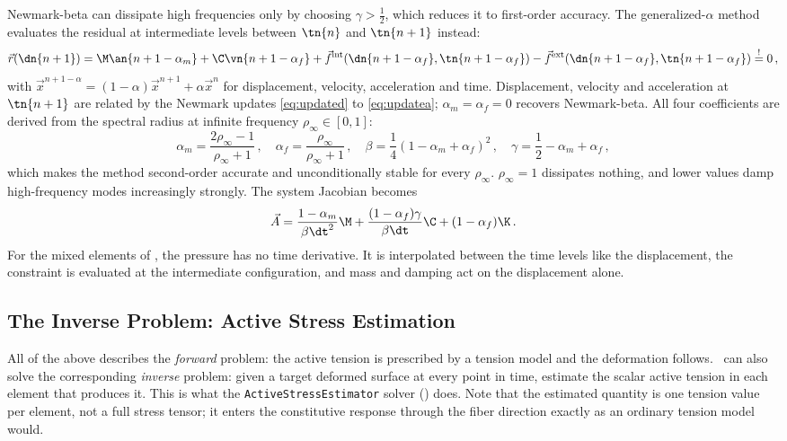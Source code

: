 Newmark-beta can dissipate high frequencies only by choosing $\gamma > \frac{1}{2}$, which reduces it to first-order accuracy.
The generalized-$\alpha$ method \cite{chung1993} evaluates the residual at intermediate levels between $\tn{n}$ and $\tn{n+1}$ instead:
\begin{equation}
    \vec r(\dn{n+1}) = \M \an{n+1-\alpha_m} + \C \vn{n+1-\alpha_f} + \vec f^\mathrm{int}(\dn{n+1-\alpha_f}, \tn{n+1-\alpha_f}) - \vec f^\mathrm{ext}(\dn{n+1-\alpha_f}, \tn{n+1-\alpha_f}) \overset{!}{=} 0 \,,
\end{equation}
with $\vec x^{n+1-\alpha} = (1-\alpha) \vec x^{n+1} + \alpha \vec x^{n}$ for displacement, velocity, acceleration and time.
Displacement, velocity and acceleration at $\tn{n+1}$ are related by the Newmark updates \autoref{eq:updated} to \autoref{eq:updatea}; $\alpha_m = \alpha_f = 0$ recovers Newmark-beta.
All four coefficients are derived from the spectral radius at infinite frequency $\rho_\infty \in [0, 1]$:
\begin{equation}
    \alpha_m = \frac{2\rho_\infty - 1}{\rho_\infty + 1} \,, \quad
    \alpha_f = \frac{\rho_\infty}{\rho_\infty + 1} \,, \quad
    \beta = \frac{1}{4} (1 - \alpha_m + \alpha_f)^2 \,, \quad
    \gamma = \frac{1}{2} - \alpha_m + \alpha_f \,,
\end{equation}
which makes the method second-order accurate and unconditionally stable for every $\rho_\infty$.
$\rho_\infty = 1$ dissipates nothing, and lower values damp high-frequency modes increasingly strongly.
The system Jacobian becomes
\begin{equation}
    \vec A = \frac{1-\alpha_m}{\beta \dt^2} \M + \frac{(1-\alpha_f) \gamma}{\beta \dt} \C + (1-\alpha_f) \K \,.
\end{equation}
For the mixed elements of , the pressure has no time derivative.
It is interpolated between the time levels like the displacement, the constraint is evaluated at the intermediate configuration, and mass and damping act on the displacement alone.


\subsection{The Inverse Problem: Active Stress Estimation}
\label{model:inverseproblem}

All of the above describes the \emph{forward} problem: the active tension is prescribed by a tension model and the deformation follows.
\CM~can also solve the corresponding \emph{inverse} problem: given a target deformed surface at every point in time, estimate the scalar active tension in each element that produces it.
This is what the \verb|ActiveStressEstimator| solver () does.
Note that the estimated quantity is one tension value per element, not a full stress tensor; it enters the constitutive response through the fiber direction exactly as an ordinary tension model would.

